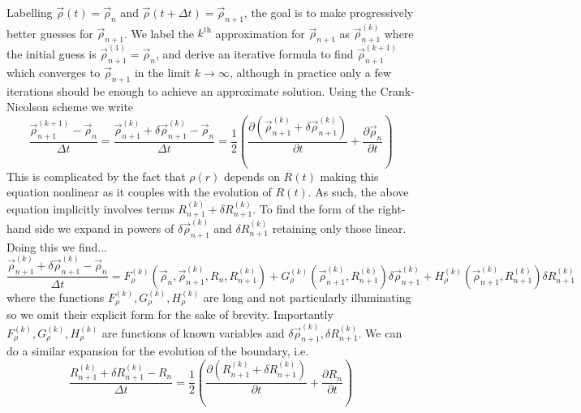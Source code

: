 \documentclass[12pt,twoside]{report}
\begin{document}
Labelling $\vec{\rho}(t) = \vec{\rho}_n$ and $\vec{\rho}(t + \Delta t) = \vec{\rho}_{n+1}$, the goal is to make progressively better guesses for $\vec{\rho}_{n+1}$.
We label the $k^\textrm{th}$ approximation for $\vec{\rho}_{n+1}$ as $\vec{\rho}_{n+1}^{(k)}$ where the initial guess is $\vec{\rho}_{n+1}^{(1)} = \vec{\rho}_n$, and derive an iterative formula to find $\vec{\rho}_{n+1}^{(k+1)}$ which converges to $\vec{\rho}_{n+1}$ in the limit $k \to \infty$, although in practice only a few iterations should be enough to achieve an approximate solution.
Using the Crank-Nicolson scheme we write
\begin{equation}
  \frac{\vec{\rho}_{n+1}^{(k+1)} - \vec{\rho}_n}{\Delta t}
  =
  \frac{\vec{\rho}_{n+1}^{(k)} + \delta \vec{\rho}_{n+1}^{(k)} - \vec{\rho}_n}{\Delta t}
  =
  \frac{1}{2}
  \left(
  \frac{\partial (\vec{\rho}_{n+1}^{(k)} + \delta \vec{\rho}_{n+1}^{(k)})}{\partial t}
  +
  \frac{\partial \vec{\rho}_n}{\partial t}
  \right)
\end{equation}
This is complicated by the fact that $\rho(r)$ depends on $R(t)$ making this equation nonlinear as it couples with the evolution of $R(t)$.
As such, the above equation implicitly involves terms $R_{n+1}^{(k)} + \delta R_{n+1}^{(k)}$.
To find the form of the right-hand side we expand in powers of $\delta \vec{\rho}_{n+1}^{(k)}$ and $\delta R_{n+1}^{(k)}$ retaining only those linear.
Doing this we find...
\begin{equation}
  \frac{\vec{\rho}_{n+1}^{(k)} + \delta \vec{\rho}_{n+1}^{(k)} - \vec{\rho}_n}{\Delta t}
  =
  F_\rho^{(k)} (\vec{\rho}_n, \vec{\rho}_{n+1}^{(k)}, R_n, R_{n+1}^{(k)}) +
  G_\rho^{(k)} (\vec{\rho}_{n+1}^{(k)}, R_{n+1}^{(k)}) \delta \vec{\rho}_{n+1}^{(k)} +
  H_\rho^{(k)} (\vec{\rho}_{n+1}^{(k)}, R_{n+1}^{(k)}) \delta R_{n+1}^{(k)}
\end{equation}
where the functions $F_\rho^{(k)},G_\rho^{(k)},H_\rho^{(k)}$ are long and not particularly illuminating so we omit their explicit form for the sake of brevity.
Importantly $F_\rho^{(k)},G_\rho^{(k)},H_\rho^{(k)}$ are functions of known variables and $\delta \vec{\rho}_{n+1}^{(k)}, \delta R_{n+1}^{(k)}$.
We can do a similar expansion for the evolution of the boundary, i.e.\
\begin{equation}\label{eq:discrete-evolution-rho}
  \frac{R_{n+1}^{(k)} + \delta R_{n+1}^{(k)} - R_n}{\Delta t}
  =
  \frac{1}{2}
  \left(
  \frac{\partial (R_{n+1}^{(k)} + \delta R_{n+1}^{(k)})}{\partial t}
  +
  \frac{\partial R_n}{\partial t}
  \right)
\end{equation}
\end{document}
